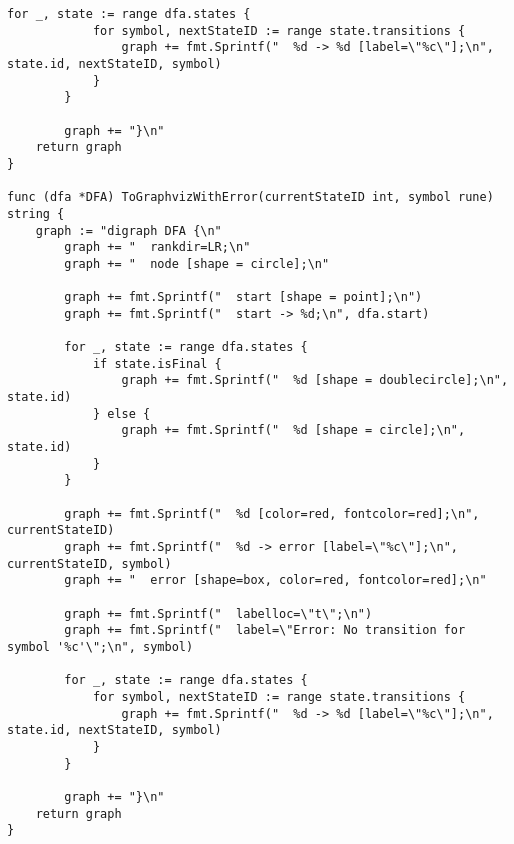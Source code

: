 \begin{appendices}
\begin{lstlisting}[caption=Модуль DFA, extendedchars=\true]
		for _, state := range dfa.states {
			for symbol, nextStateID := range state.transitions {
				graph += fmt.Sprintf("  %d -> %d [label=\"%c\"];\n", state.id, nextStateID, symbol)
			}
		}
		
		graph += "}\n"
	return graph
}

func (dfa *DFA) ToGraphvizWithError(currentStateID int, symbol rune) string {
	graph := "digraph DFA {\n"
		graph += "  rankdir=LR;\n"
		graph += "  node [shape = circle];\n"
		
		graph += fmt.Sprintf("  start [shape = point];\n")
		graph += fmt.Sprintf("  start -> %d;\n", dfa.start)
		
		for _, state := range dfa.states {
			if state.isFinal {
				graph += fmt.Sprintf("  %d [shape = doublecircle];\n", state.id)
			} else {
				graph += fmt.Sprintf("  %d [shape = circle];\n", state.id)
			}
		}
		
		graph += fmt.Sprintf("  %d [color=red, fontcolor=red];\n", currentStateID)
		graph += fmt.Sprintf("  %d -> error [label=\"%c\"];\n", currentStateID, symbol)
		graph += "  error [shape=box, color=red, fontcolor=red];\n"
		
		graph += fmt.Sprintf("  labelloc=\"t\";\n")
		graph += fmt.Sprintf("  label=\"Error: No transition for symbol '%c'\";\n", symbol)
		
		for _, state := range dfa.states {
			for symbol, nextStateID := range state.transitions {
				graph += fmt.Sprintf("  %d -> %d [label=\"%c\"];\n", state.id, nextStateID, symbol)
			}
		}
		
		graph += "}\n"
	return graph
}

		\end{lstlisting}
		
\end{appendices}